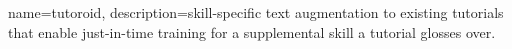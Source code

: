 {
    name=tutoroid,
    description={skill-specific text augmentation to existing tutorials that enable just-in-time training for a supplemental skill a tutorial glosses over.}
}
\newcommand\condcap[1]{\ifnum\ifhmode\spacefactor\else2000\fi>1000 \uppercase{#1}\else#1\fi}
\newcommand {\systemname}{\Glspl{name}}
\newcommand {\user}{Colin}
\newcommand {\userpro}{\condcap{h}e}
\newcommand {\userpos}{\condcap{h}is}

\newcommand {\andrew}[1]{{\color{red}\bf{AH: #1}\normalfont}}
\newcommand {\appachu}[1]{{\color{blue}\bf{CA: #1}\normalfont}}

